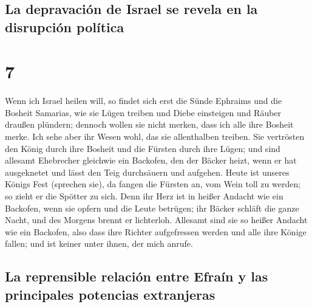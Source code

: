 \hypertarget{la-depravaciuxf3n-de-israel-se-revela-en-la-disrupciuxf3n-poluxedtica}{%
\subsection{La depravación de Israel se revela en la disrupción
política}\label{la-depravaciuxf3n-de-israel-se-revela-en-la-disrupciuxf3n-poluxedtica}}

\hypertarget{section-6}{%
\section{7}\label{section-6}}

 Wenn ich Israel heilen will, so findet sich erst die
Sünde Ephraims und die Bosheit Samarias, wie sie Lügen treiben und Diebe
einsteigen und Räuber draußen plündern;  dennoch wollen
sie nicht merken, dass ich alle ihre Bosheit merke. Ich sehe aber ihr
Wesen wohl, das sie allenthalben treiben.  Sie vertrösten
den König durch ihre Bosheit und die Fürsten durch ihre Lügen;
 und sind allesamt Ehebrecher gleichwie ein Backofen, den
der Bäcker heizt, wenn er hat ausgeknetet und lässt den Teig durchsäuern
und aufgehen.  Heute ist unseres Königs Fest (sprechen
sie), da fangen die Fürsten an, vom Wein toll zu werden; so zieht er die
Spötter zu sich.  Denn ihr Herz ist in heißer Andacht wie
ein Backofen, wenn sie opfern und die Leute betrügen; ihr Bäcker schläft
die ganze Nacht, und des Morgens brennt er lichterloh. 
Allesamt sind sie so heißer Andacht wie ein Backofen, also dass ihre
Richter aufgefressen werden und alle ihre Könige fallen; und ist keiner
unter ihnen, der mich anrufe.

\hypertarget{la-reprensible-relaciuxf3n-entre-efrauxedn-y-las-principales-potencias-extranjeras}{%
\subsection{La reprensible relación entre Efraín y las principales
potencias
extranjeras}\label{la-reprensible-relaciuxf3n-entre-efrauxedn-y-las-principales-potencias-extranjeras}}

